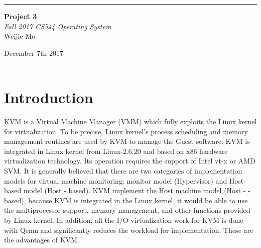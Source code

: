 \documentclass[10pt,draftclsnofoot,peerreview,letterpaper,onecolumn,]{IEEEtran}
\begin{document}
\begin{titlepage} %
	
	\raggedleft %
	
	\rule{1pt}{\textheight} %
	\hspace{0.05\textwidth} %
	\parbox[b]{0.75\textwidth}{ %
		
		{\Huge\bfseries Project 3 }\\[2\baselineskip] %
		{\large\textit{Fall 2017 CS544 Operating System}}\\[4\baselineskip] %
		{\Large Weijie Mo} %
		
		\vspace{0.5\textheight} %
		
		{\noindent December 7th 2017}\\[\baselineskip] %
        {\noindent }\\[\baselineskip] %
	}

\end{titlepage}

\section{Introduction}
KVM is a Virtual Machine Manager (VMM) which fully exploits the Linux kernel for virtualization. To be precise, Linux kernel’s process scheduling and memory management routines are used by KVM to manage the Guest software. KVM is integrated in Linux kernel from Linux-2.6.20 and based on x86 hardware virtualization technology. Its operation requires the support of Intel vt-x or AMD SVM. It is generally believed that there are two categories of implementation models for virtual machine monitoring: monitor model (Hypervisor) and Host-based model (Host - based). KVM implement the Host machine model (Host - -based), because KVM is integrated in the Linux kernel, it would be able to use the multiprocessor support, memory management, and other functions provided by Linux kernel. In addition, all the I/O virtualization work for KVM is done with Qemu and significantly reduces the workload for implementation. These are the advantages of KVM.
\end{document}
